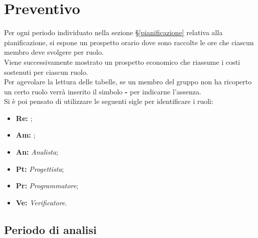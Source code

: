 \section{Preventivo}
\label{preventivo}
Per ogni periodo individuato nella sezione \S\ref{pianificazione} relativa alla pianificazione, si espone un prospetto orario dove sono raccolte le ore che ciascun membro deve svolgere per ruolo.\\Viene successivamente mostrato un prospetto economico che riassume i costi sostenuti per ciascun ruolo.\\
Per agevolare la lettura delle tabelle, se un membro del gruppo non ha ricoperto un certo ruolo verrà inserito il simbolo \textbf{-} per indicarne l'assenza.\\Si è poi pensato di utilizzare le seguenti sigle per identificare i ruoli:
\begin{itemize}
\item \textbf{Re:} {\Responsabile};
\item \textbf{Am:} {\Amministratore};
\item \textbf{An:} \textit{Analista};
\item \textbf{Pt:} \textit{Progettista};
\item \textbf{Pr:} \textit{Programmatore};
\item \textbf{Ve:} \textit{Verificatore}.
\end{itemize}
\newpage

\subsection{Periodo di analisi}
